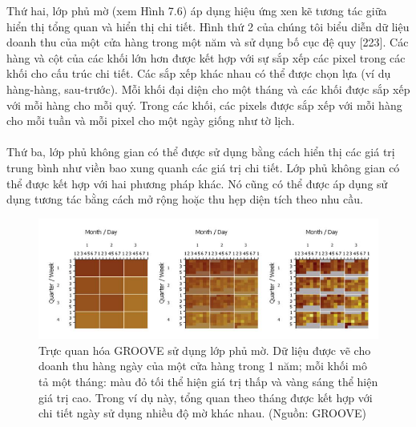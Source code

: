 Thứ hai, lớp phủ mờ (xem Hình 7.6) áp dụng hiệu ứng xen kẽ tương tác giữa hiển thị tổng quan và hiển thị chi tiết. Hình thứ 2 của chúng tôi biểu diễn dữ liệu doanh thu của một cửa hàng trong một năm và sử dụng bố cục đệ quy [223]. Các hàng và cột của các khối lớn hơn được kết hợp với sự sắp xếp các pixel trong các khối cho cấu trúc chi tiết. Các sắp xếp khác nhau có thể được chọn lựa (ví dụ hàng-hàng, sau-trước). Mỗi khối đại diện cho một tháng và các khối được sắp xếp với mỗi hàng cho mỗi quý. Trong các khối, các pixels được sắp xếp với mỗi hàng cho mỗi tuần và mỗi pixel cho một ngày giống như tờ lịch. 
\\ \\
Thứ ba, lớp phủ không gian có thể được sử dụng bằng cách hiển thị các giá trị trung bình như viền bao xung quanh các giá trị chi tiết. Lớp phủ không gian có thể được kết hợp với hai phương pháp khác. Nó cũng có thể được áp dụng sử dụng tương tác bằng cách mở rộng hoặc thu hẹp diện tích theo nhu cầu.
\begin{figure}[H] %
    \centering %
    \includegraphics[width=1\textwidth]{assets/fig_7_6.png} 
    \caption{Trực quan hóa GROOVE sử dụng lớp phủ mờ. Dữ liệu được vẽ cho doanh thu hàng ngày của một cửa hàng trong 1 năm; mỗi khối mô tả một tháng: màu đỏ tối thể hiện giá trị thấp và vàng sáng thể hiện giá trị cao. Trong ví dụ này, tổng quan theo tháng được kết hợp với chi tiết ngày sử dụng nhiều độ mờ khác nhau. (Nguồn: GROOVE)} %
    \label{fig:f7.6}
\end{figure}